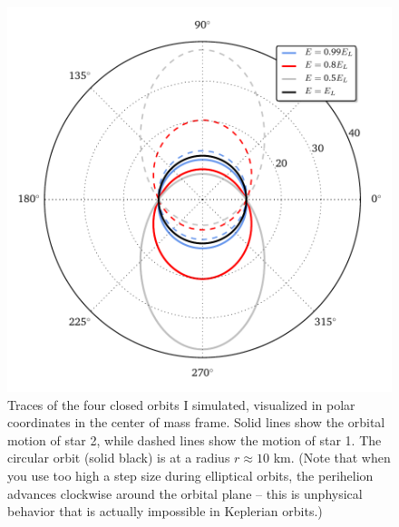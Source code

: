 \documentclass[11pt]{article}
\begin{document}
\begin{figure}[!h]
\centering
\includegraphics[scale=1]{stable_orbit/orbit_diagram.pdf}
\caption{\label{fig:trace} Traces of the four closed orbits I simulated, visualized in polar coordinates in the center of mass frame. Solid lines show the orbital motion of star 2, while dashed lines show the motion of star 1. The circular orbit (solid black) is at a radius $r \approx 10$ km. (Note that when you use too high a step size during elliptical orbits, the perihelion advances clockwise around the orbital plane -- this is unphysical behavior that is actually impossible in Keplerian orbits.)}
\end{figure}
\end{document}
